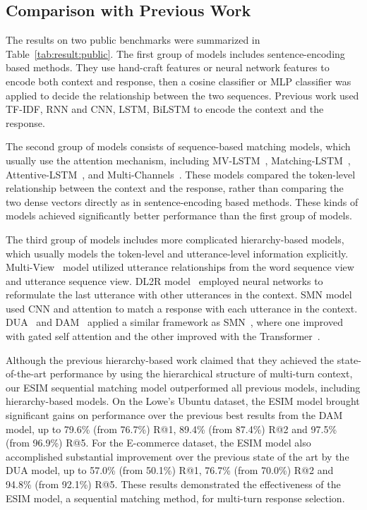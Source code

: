 \documentclass[letterpaper]{article} \usepackage{aaai19}  \usepackage{times}  \usepackage{helvet}  \usepackage{courier}  \usepackage{url}  \usepackage{graphicx}
\begin{document}
\subsection{Comparison with Previous Work}

The results on two public benchmarks were summarized in Table~\ref{tab:result:public}. The first group of models includes sentence-encoding based methods. They use hand-craft features or neural network features to encode both context and response, then a cosine classifier or MLP classifier was applied to decide the relationship between the two sequences. Previous work used TF-IDF, RNN \cite{DBLP:conf/sigdial/LowePSP15} and CNN, LSTM, BiLSTM \cite{DBLP:journals/corr/KadlecSK15} to encode the context and the response. 

The second group of models consists of sequence-based matching models, which usually use the attention mechanism, including MV-LSTM~\cite{DBLP:conf/aaai/WanLGXPC16}, Matching-LSTM~\cite{DBLP:conf/naacl/WangJ16}, Attentive-LSTM~\cite{DBLP:journals/corr/TanXZ15}, and Multi-Channels~\cite{DBLP:conf/acl/WuWXZL17}. These models compared the token-level relationship between the context and the response, rather than comparing the two dense vectors directly as in sentence-encoding based methods. These kinds of models achieved significantly better performance than the first group of models. 

The third group of models includes more complicated hierarchy-based models, which usually models the token-level and utterance-level information explicitly. Multi-View~\cite{DBLP:conf/emnlp/ZhouDWZYTLY16} model utilized utterance relationships from the word sequence view and utterance sequence view. DL2R model~\cite{DBLP:conf/sigir/YanSW16} employed neural networks to reformulate the last utterance with other utterances in the context. SMN model~\cite{DBLP:conf/acl/WuWXZL17} used CNN and attention to match a response with each utterance in the context. DUA~\cite{DBLP:conf/coling/ZhangLZZL18} and DAM~\cite{DBLP:conf/acl/WuLCZDYZL18} applied a similar framework as SMN~\cite{DBLP:conf/acl/WuWXZL17}, where one improved with gated self attention and the other improved with the Transformer~\cite{DBLP:conf/nips/VaswaniSPUJGKP17}. 

Although the previous hierarchy-based work claimed that they achieved the state-of-the-art performance by using the hierarchical structure of multi-turn context, our ESIM sequential matching model outperformed all previous models, including hierarchy-based models. On the Lowe's Ubuntu dataset, the ESIM model brought significant gains on performance over the previous best results from the DAM model, up to 79.6\% (from 76.7\%) R@1, 89.4\% (from 87.4\%) R@2 and 97.5\% (from 96.9\%) R@5. For the E-commerce dataset, the ESIM model also accomplished substantial improvement over the previous state of the art by the DUA model, up to 57.0\% (from 50.1\%) R@1, 76.7\% (from 70.0\%) R@2 and 94.8\% (from 92.1\%) R@5. These results demonstrated the effectiveness of the ESIM model, a sequential matching method, for multi-turn response selection.
\end{document}
